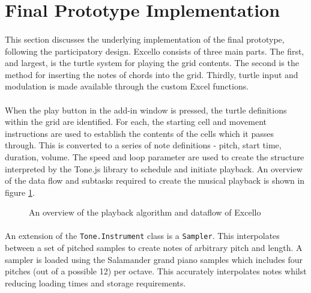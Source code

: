 \section{Final Prototype Implementation}

\paragraph{} This section discusses the underlying implementation of the final prototype, following the participatory design. Excello consists of three main parts. The first, and largest, is the turtle system for playing the grid contents. The second is the method for inserting the notes of chords into the grid. Thirdly, turtle input and modulation is made available through the custom Excel functions.

\paragraph{} When the play button in the add-in window is pressed, the turtle definitions within the grid are identified. For each, the starting cell and movement instructions are used to establish the contents of the cells which it passes through. This is converted to a series of note definitions - pitch, start time, duration, volume. The speed and loop parameter are used to create the structure interpreted by the Tone.js library to schedule and initiate playback. An overview of the data flow and subtasks required to create the musical playback is shown in figure \ref{fig:overview}.

\begin{figure}[tbh]
\begin{center}

\end{center}
\caption{An overview of the playback algorithm and dataflow of Excello}
\label{fig:overview}
\end{figure}

\paragraph{} An extension of the \texttt{Tone.Instrument} class is a \texttt{Sampler}. This interpolates between a set of pitched samples to create notes of arbitrary pitch and length. A sampler is loaded using the Salamander grand piano samples which includes four pitches (out of a possible 12) per octave. This accurately interpolates notes whilst reducing loading times and storage requirements.

